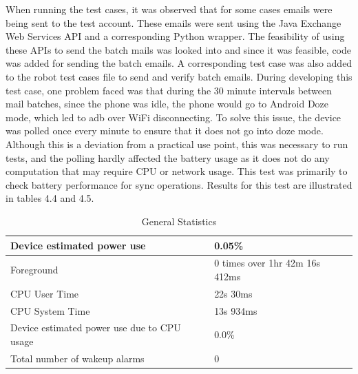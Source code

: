 When running the test cases, it was observed that for some cases emails were being sent to the test account. These emails were sent using the Java Exchange Web Services API and a corresponding Python wrapper. The feasibility of using these APIs to send the batch mails was looked into and since it was feasible, code was added for sending the batch emails. A corresponding test case was also added to the robot test cases file to send and verify batch emails. During developing this test case, one problem faced was that during the 30 minute intervals between mail batches, since the phone was idle, the phone would go to Android Doze mode, which led to adb over WiFi disconnecting. To solve this issue, the device was polled once every minute to ensure that it does not go into doze mode. Although this is a deviation from a practical use point, this was necessary to run tests, and the polling hardly affected the battery usage as it does not do any computation that may require CPU or network usage. This test was primarily to check battery performance for sync operations. Results for this test are illustrated in tables 4.4 and 4.5.

\begin{table}[!h]
\begin{center}
\caption{General Statistics}
\begin{tabular}{|P{8cm}|P{6.5cm}|}
\hline
Device estimated power use                  & 0.05\%                      \\ \hline
Foreground                                  & 0 times over 1hr 42m 16s 412ms \\ \hline
CPU User Time                               & 22s 30ms                 \\ \hline
CPU System Time                             & 13s 934ms                \\ \hline
Device estimated power use due to CPU usage & 0.0\%                       \\ \hline
Total number of wakeup alarms               & 0     \\    \hline                
\end{tabular}
\end{center}
\end{table}

